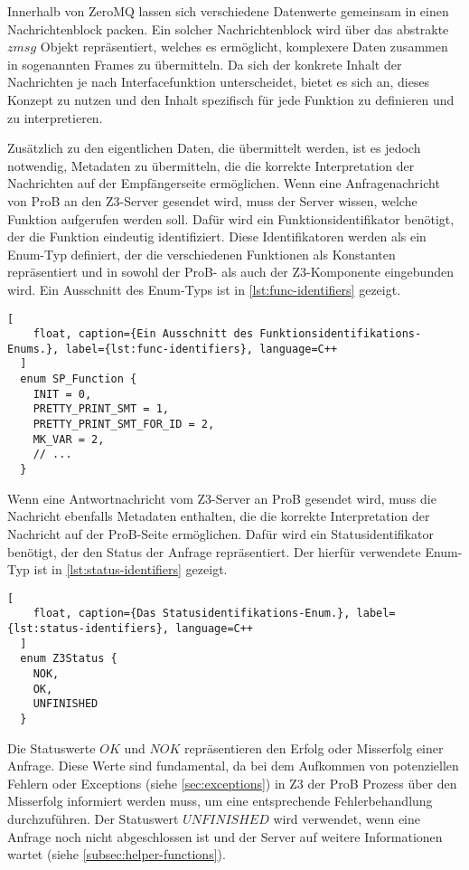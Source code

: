 Innerhalb von ZeroMQ lassen sich verschiedene Datenwerte gemeinsam in einen Nachrichtenblock packen.
Ein solcher Nachrichtenblock wird über das abstrakte $zmsg$ Objekt repräsentiert, welches es ermöglicht,
komplexere Daten zusammen in sogenannten Frames zu übermitteln.
Da sich der konkrete Inhalt der Nachrichten je nach Interfacefunktion unterscheidet,
bietet es sich an, dieses Konzept zu nutzen und den Inhalt spezifisch für jede Funktion zu definieren und zu interpretieren.

Zusätzlich zu den eigentlichen Daten, die übermittelt werden, ist es jedoch notwendig, Metadaten zu übermitteln,
die die korrekte Interpretation der Nachrichten auf der Empfängerseite ermöglichen.
Wenn eine Anfragenachricht von ProB an den Z3-Server gesendet wird, muss der Server wissen, welche Funktion aufgerufen werden soll.
Dafür wird ein Funktionsidentifikator benötigt, der die Funktion eindeutig identifiziert.
Diese Identifikatoren werden als ein Enum-Typ definiert, der die verschiedenen Funktionen als Konstanten repräsentiert und in sowohl
der ProB- als auch der Z3-Komponente eingebunden wird.
Ein Ausschnitt des Enum-Typs ist in \cref{lst:func-identifiers} gezeigt.

\begin{lstlisting}[
    float, caption={Ein Ausschnitt des Funktionsidentifikations-Enums.}, label={lst:func-identifiers}, language=C++
  ]
  enum SP_Function {
    INIT = 0,
    PRETTY_PRINT_SMT = 1,
    PRETTY_PRINT_SMT_FOR_ID = 2,
    MK_VAR = 2,
    // ...
  }
\end{lstlisting}

Wenn eine Antwortnachricht vom Z3-Server an ProB gesendet wird, muss die Nachricht ebenfalls Metadaten enthalten,
die die korrekte Interpretation der Nachricht auf der ProB-Seite ermöglichen.
Dafür wird ein Statusidentifikator benötigt, der den Status der Anfrage repräsentiert.
Der hierfür verwendete Enum-Typ ist in \cref{lst:status-identifiers} gezeigt.

\begin{lstlisting}[
    float, caption={Das Statusidentifikations-Enum.}, label={lst:status-identifiers}, language=C++
  ]
  enum Z3Status {
    NOK,
    OK,
    UNFINISHED
  }
\end{lstlisting}

Die Statuswerte $OK$ und $NOK$ repräsentieren den Erfolg oder Misserfolg einer Anfrage.
Diese Werte sind fundamental, da bei dem Aufkommen von potenziellen Fehlern oder Exceptions (siehe \cref{sec:exceptions}) in Z3 der ProB Prozess über den Misserfolg informiert werden muss,
um eine entsprechende Fehlerbehandlung durchzuführen. 
Der Statuswert $UNFINISHED$ wird verwendet, wenn eine Anfrage noch nicht abgeschlossen ist und der Server auf weitere Informationen wartet (siehe \cref{subsec:helper-functions}).

